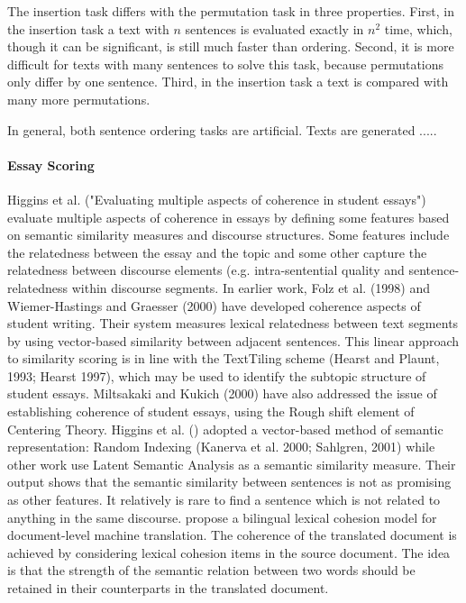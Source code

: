 The insertion task differs with the permutation task in three properties. 
First, in the insertion task a text with $n$ sentences is evaluated exactly in $n^2$ time, which, though it can be significant, is still much faster than ordering. 
Second, it is more difficult for texts with many sentences to solve this task, because permutations only differ by one sentence.  
Third, in the insertion task a text is compared with many more permutations.  
 
In general, both sentence ordering tasks are artificial. 
Texts are generated ..... 

\paragraph{Essay Scoring} 

Higgins et al. ("Evaluating multiple aspects of coherence in student essays") evaluate multiple aspects of coherence in essays by defining some features based on semantic similarity measures and discourse structures. 
Some features include the relatedness between the essay and the topic and some other capture the relatedness between discourse elements (e.g. intra-sentential quality and sentence-relatedness within discourse segments. 
In earlier work, Folz et al. (1998) and Wiemer-Hastings and Graesser (2000) have developed coherence aspects of student writing.
Their system measures lexical relatedness between text segments by using vector-based similarity between adjacent sentences.
This linear approach to similarity scoring is in line with the TextTiling scheme (Hearst and Plaunt, 1993; Hearst 1997), which may be used to identify the subtopic structure of student essays. 
Miltsakaki and Kukich (2000) have also addressed the issue of establishing coherence of student essays, using the Rough shift element of Centering Theory. 
Higgins et al. () adopted a vector-based method of semantic representation: Random Indexing (Kanerva et al. 2000; Sahlgren, 2001) while other work use Latent Semantic Analysis as a semantic similarity measure. 
Their output shows that the semantic similarity between sentences is not as promising as other features. 
It relatively is rare to find a sentence which is not related to anything in the same discourse. 
 propose a bilingual lexical cohesion model for document-level machine translation.  
The coherence of the translated document is achieved by considering lexical cohesion items in the source document. 
The idea is that the strength of the semantic relation between two words should be retained in their counterparts in the translated document. 
